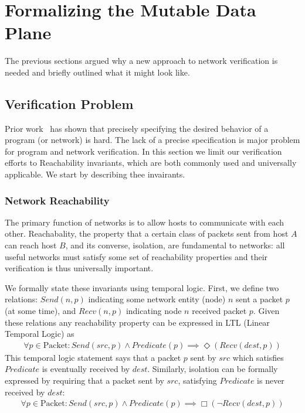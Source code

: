 \section{Formalizing the Mutable Data Plane}
\label{sec:formal}
The previous sections argued why a new approach to network verification is needed and briefly outlined what it might look like. 

\subsection{Verification Problem}
Prior work~\cite{popl:DeMilloLP77} has shown that precisely specifying the desired behavior of a program (or network) is hard. The lack of a precise specification
is major problem for program and network verification. In this section we limit our verification efforts to Reachability invariants, which are both commonly used
and universally applicable. We start by describing thee invairants.

\subsubsection{Network Reachability}
The primary function of networks is to allow hosts to communicate with each other. Reachabality, the property that a certain class of packets sent from host $A$ 
can reach host $B$, and its converse, isolation, are fundamental to networks: all useful networks must satisfy some set of reachability properties and their
verification is thus universally important. 

We formally state these invariants using temporal logic. First, we define two relations: $Send(n, p)$ indicating some network entity (node) $n$ sent
a packet $p$ (at some time), and $Recv(n, p)$ indicating node $n$ received packet $p$. Given these relations any reachability property can be expressed in 
LTL (Linear Temporal Logic) as
\begin{align*}
\forall p\in \text{Packet}: Send(src, p) \land Predicate(p) \implies \Diamond(Recv(dest, p))
\end{align*}
This temporal logic statement says that a packet $p$ sent by $src$ which satisfies $Predicate$ is eventually received by $dest$.
Similarly, isolation can be formally expressed by requiring that a packet sent by $src$, satisfying $Predicate$ is never received by $dest$:
\begin{align*}
\forall p\in \text{Packet}: Send(src, p) \land Predicate(p) \implies \Box(\neg Recv(dest, p))
\end{align*}


